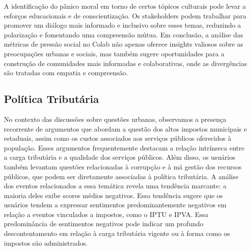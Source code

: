 A identificação do pânico moral em torno de certos tópicos culturais pode levar a esforços educacionais e de conscientização. Os stakeholders podem trabalhar para promover um diálogo mais informado e inclusivo sobre esses temas, reduzindo a polarização e fomentando uma compreensão mútua. Em conclusão, a análise das métricas de pressão social no Colab não apenas oferece insights valiosos sobre as preocupações urbanas e sociais, mas também sugere oportunidades para a construção de comunidades mais informadas e colaborativas, onde as divergências são tratadas com empatia e compreensão.

\subsection{Política Tributária}

No contexto das discussões sobre questões urbanas, observamos a presença recorrente de argumentos que abordam a questão dos altos impostos municipais e estaduais, assim como os custos associados aos serviços públicos oferecidos à população. Esses argumentos frequentemente destacam a relação intrínseca entre a carga tributária e a qualidade dos serviços públicos. Além disso, os usuários também levantam questões relacionadas à corrupção e à má gestão dos recursos públicos, que podem ser diretamente associadas à política tributária. A análise dos eventos relacionados a essa temática revela uma tendência marcante: a maioria deles exibe scores médios negativos. Essa tendência sugere que os usuários tendem a expressar sentimentos predominantemente negativos em relação a eventos vinculados a impostos, como o IPTU e IPVA. Essa predominância de sentimentos negativos pode indicar um profundo descontentamento em relação à carga tributária vigente ou à forma como os impostos são administrados.

